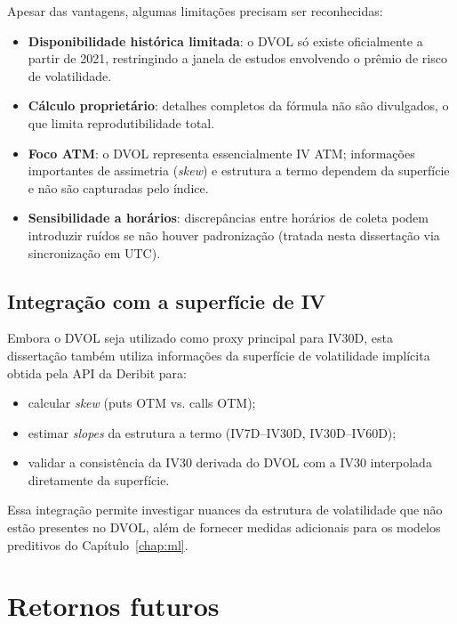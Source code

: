 Apesar das vantagens, algumas limitações precisam ser reconhecidas:

\begin{itemize}
    \item \textbf{Disponibilidade histórica limitada}: o DVOL só existe oficialmente
    a partir de 2021, restringindo a janela de estudos envolvendo o prêmio de
    risco de volatilidade.
    \item \textbf{Cálculo proprietário}: detalhes completos da fórmula não são
    divulgados, o que limita reprodutibilidade total.
    \item \textbf{Foco ATM}: o DVOL representa essencialmente IV ATM; informações
    importantes de assimetria (\textit{skew}) e estrutura a termo dependem da
    superfície e não são capturadas pelo índice.
    \item \textbf{Sensibilidade a horários}: discrepâncias entre horários de coleta
    podem introduzir ruídos se não houver padronização (tratada nesta dissertação
    via sincronização em UTC).
\end{itemize}

\subsection{Integração com a superfície de IV}

Embora o DVOL seja utilizado como proxy principal para IV30D, esta dissertação
também utiliza informações da superfície de volatilidade implícita obtida pela API da
Deribit para:

\begin{itemize}
    \item calcular \textit{skew} (puts OTM vs. calls OTM);
    \item estimar \textit{slopes} da estrutura a termo (IV7D–IV30D, IV30D–IV60D);
    \item validar a consistência da IV30 derivada do DVOL com a IV30 interpolada
    diretamente da superfície.
\end{itemize}

Essa integração permite investigar nuances da estrutura de volatilidade que não
estão presentes no DVOL, além de fornecer medidas adicionais para os modelos
preditivos do Capítulo~\ref{chap:ml}.

\section{Retornos futuros}

